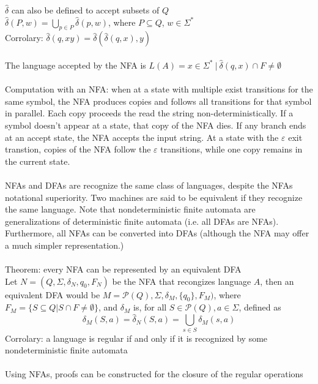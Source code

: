 \documentclass{article}
\newcommand*{\<}{\langle}
\renewcommand*{\>}{\rangle}
\begin{document}
			$\hat{\delta}$ can also be defined to accept subsets of $Q$ \\
			$\hat{\delta}(P, w) = \bigcup\limits_{p \in P}\hat{\delta}(p, w)$, where $P \subseteq Q$, $w \in \Sigma^*$ \\
			Corrolary: $\hat{\delta}(q, xy) = \hat{\delta}(\hat{\delta}(q, x), y)$ \\
			\\
			The language accepted by the NFA is $L(A) = {x \in \Sigma^*\:|\:\hat{\delta}(q, x) \cap F \neq \emptyset}$ \\
			\\
			Computation with an NFA: when at a state with multiple exist transitions for the same symbol, the NFA produces copies and follows all transitions for that symbol in parallel. Each copy proceeds the read the string non-deterministically. If a symbol doesn't appear at a state, that copy of the NFA dies. If any branch ends at an accept state, the NFA accepts the input string. At a state with the $\varepsilon$ exit transtion, copies of the NFA follow the $\varepsilon$ transitions, while one copy remains in the current state. \\
			\\
			NFAs and DFAs are recognize the same class of languages, despite the NFAs notational superiority. Two machines are said to be equivalent if they recognize the same language. Note that nondeterministic finite automata are generalizations of deterministic finite automata (i.e. all DFAs are NFAs). Furthermore, all NFAs can be converted into DFAs (although the NFA may offer a much simpler representation.) \\
			\\
			Theorem: every NFA can be represented by an equivalent DFA \\
			Let $N = (Q, \Sigma, \delta_N, q_0, F_N)$ be the NFA that recongizes language $A$, then an equivalent DFA would be $M = \mathcal{P}(Q), \Sigma, \delta_M, \{q_0\}, F_M)$, where $F_M = \{S \subseteq Q | S \cap F \neq \emptyset\}$, and $\delta_M$ is, for all $S \in \mathcal{P}(Q), a \in \Sigma$, defined as \\
			\begin{equation*}
				\delta_M(S, a) = \hat{\delta}_N(S, a) = \bigcup\limits_{s \in S}\delta_M(s, a)
				\end{equation*}
			Corrolary: a language is regular if and only if it is recognized by some nondeterministic finite automata \\
			\\
			Using NFAs, proofs can be constructed for the closure of the regular operations \\
\end{document}
